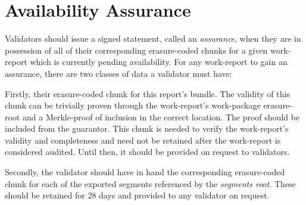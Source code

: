 \section{Availability Assurance}\label{sec:assurance}

Validators should issue a signed statement, called an \emph{assurance}, when they are in possession of all of their corresponding erasure-coded chunks for a given work-report which is currently pending availability. For any work-report to gain an assurance, there are two classes of data a validator must have:

Firstly, their erasure-coded chunk for this report's bundle. The validity of this chunk can be trivially proven through the work-report's work-package erasure-root and a Merkle-proof of inclusion in the correct location. The proof should be included from the guarantor. This chunk is needed to verify the work-report's validity and completeness and need not be retained after the work-report is considered audited. Until then, it should be provided on request to validators.

Secondly, the validator should have in hand the corresponding erasure-coded chunk for each of the exported segments referenced by the \emph{segments root}. These should be retained for 28 days and provided to any validator on request.


